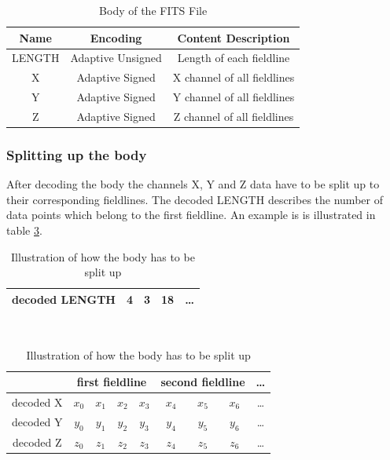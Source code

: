 \begin{table}[!htbp]
\center
\begin{tabular}{|c|c|c|}
	\hline
	Name  & Encoding & Content Description	\\\hline
    LENGTH & Adaptive Unsigned & Length of each fieldline\\
    X & Adaptive Signed & X channel of all fieldlines\\
    Y & Adaptive Signed & Y channel of all fieldlines\\
    Z & Adaptive Signed & Z channel of all fieldlines\\\hline
\end{tabular}
\caption{Body of the FITS File}
\label{anhang:format:body}
\end{table}

\subsubsection{Splitting up the body} \label{anhang:format:content:split}
After decoding the body the channels X, Y and Z data have to be split up to their corresponding fieldlines. The decoded LENGTH describes the number of data points which belong to the first fieldline. An example is is illustrated in table \ref{anhang:format:content:split:illustration}.

\begin{table}[!htbp]
	\center
	\begin{tabular}{|c||c|c|c|c}
	\hline
		decoded LENGTH & 4 & 3 & 18 & \ldots\\\hline
	\end{tabular}
	\\
	[\baselineskip]
	\begin{tabular}{|c||c|c|c|c||c|c|c||c}
	\hline
		 & \multicolumn{4}{|c||}{first fieldline} & \multicolumn{3}{|c||}{second fieldline} & \multicolumn{1}{|c}{\ldots}\\\hline
		decoded X & $x_0$ & $x_1$ & $x_2$ & $x_3$ & $x_4$ & $x_5$ & $x_6$ & \ldots \\
		decoded Y & $y_0$ & $y_1$ & $y_2$ & $y_3$ & $y_4$ & $y_5$ & $y_6$ & \ldots \\
		decoded Z & $z_0$ & $z_1$ & $z_2$ & $z_3$ & $z_4$ & $z_5$ & $z_6$ & \ldots \\\hline
	\end{tabular}
	\caption{Illustration of how the body has to be split up}
	\label{anhang:format:content:split:illustration}
\end{table}

